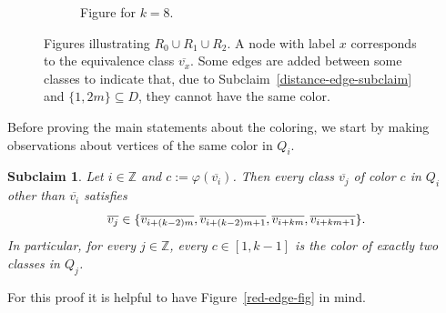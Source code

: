 \documentclass[a4paper,10pt,hidelinks]{amsart}
\renewcommand{\phi}{\ensuremath{\varphi}}
\newtheorem{subclaim}[theorem]{Subclaim}
\newenvironment{claimproof}[1][\proofname]{\proof[#1]\renewcommand{\qedsymbol}{$\blacksquare$}}{\endproof}
\newenvironment{subclaimproof}[1][\proofname]{\proof[#1]\renewcommand{\qedsymbol}{$\blacklozenge$}}{\endproof}
\theoremstyle{definition}
\begin{document}
\begin{claimproof}[Proof of Claim~\ref{structure-claim} when $k \in \{6,8\}$]
\begin{figure}[ht]
\begin{subfigure}{0.4\textwidth}
                \caption{\label{basic-ring-fig-8} Figure for $k=8$.}
            \end{subfigure}


            \caption{\label{basic-ring-fig} Figures illustrating $R_0 \cup R_1 \cup R_2$. A node with label $x$ corresponds to the equivalence class $\overline{v_{x}}$. Some edges are added between some classes to indicate that, due to Subclaim~\ref{distance-edge-subclaim} and $\{1, 2m\} \subseteq D$, they cannot have the same color.}
        \end{figure}

        Before proving the main statements about the coloring, we start by making observations about vertices of the same color in $Q_i$.

        \begin{subclaim}\label{four-two-subclaim}
            Let $i \in \mathbb{Z}$ and $c := \phi(\overline{v_i})$. Then every class $\overline{v_{j}}$ of color $c$ in $Q_i$ other than $\overline{v_{i}}$ satisfies
            \begin{equation}\notag
                \overline{v_{j}} \in \{\overline{v_{i + (k - 2)m}}, \overline{v_{i + (k - 2)m + 1}}, \overline{v_{i + km}}, \overline{v_{i + km + 1}}\}.
            \end{equation}
            In particular, for every $j \in \mathbb{Z}$, every $c\in [1,k-1]$ is the color of exactly two classes in $Q_j$.
        \end{subclaim}
        \begin{subclaimproof}
            For this proof it is helpful to have Figure~\ref{red-edge-fig} in mind.


\end{subclaimproof}
\end{claimproof}
\end{document}
